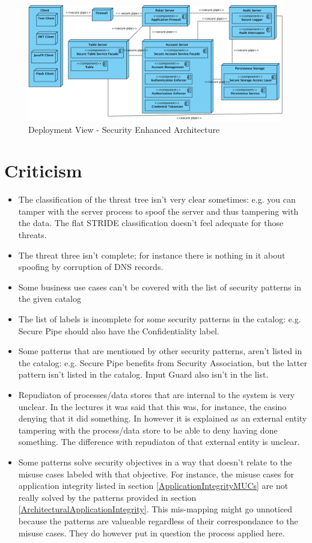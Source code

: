 \documentclass[a4paper,11pt]{report}
\begin{document}
\begin{figure}[h]
  \begin{center}
    \includegraphics[angle=90,scale=0.65]{deployment_secured.png}
  \end{center}
  \caption{Deployment View - Security Enhanced Architecture}\label{fig:deployment_secured}
\end{figure}


\section{Criticism}
\label{criticism}
\begin{itemize}
\item The classification of the threat tree isn't very clear sometimes: e.g. you can tamper with the server process
to spoof the server and thus tampering with the data. The flat STRIDE classification doesn't feel adequate for those threats.
\item The threat three isn't complete; for instance there is nothing in it about spoofing by corruption of 
DNS records.
\item Some business use cases can't be covered with the list of security patterns in the given catalog
\item The list of labels is incomplete for some security patterns in the catalog: e.g. Secure Pipe should also have
the Confidentiality label.
\item Some patterns that are mentioned by other security patterns, aren't listed in the catalog: e.g. Secure Pipe 
benefits from Security Association, but the latter pattern isn't listed in the catalog. Input Guard also isn't
in the list.
\item Repudiaton of processes/data stores that are internal to the system is very unclear. In the lectures it was said that this was, for instance, the casino denying that it did something. In \cite[p270]{1202957} however it is explained as an external entity tampering with the process/data store to be able to deny having done something. The difference with repudiaton of that external entity is unclear.
\item Some patterns solve security objectives in a way that doesn't relate to the misuse cases labeled with that objective. For instance, the misuse cases for application integrity listed in section \ref{ApplicationIntegrityMUCs} are not really solved by the patterns provided in section \ref{ArchitecturalApplicationIntegrity}. This mis-mapping might go unnoticed because the patterns are valueable regardless of their correspondance to the misuse cases. They do however put in question the process applied here.
\end{itemize}
\end{document}
